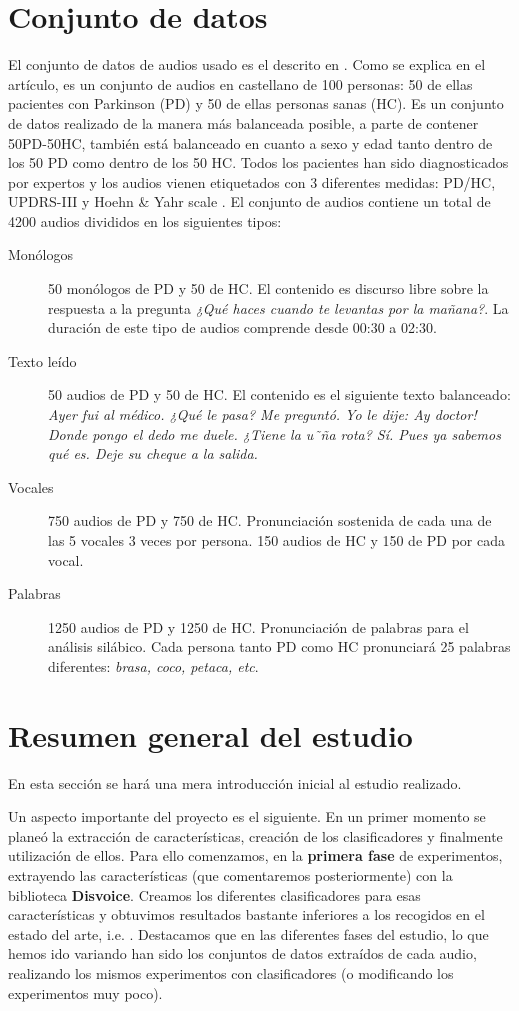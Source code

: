 \section{Conjunto de datos}
El conjunto de datos de audios usado es el descrito en \cite{OrzCorpus}. Como se explica en el artículo, es un conjunto de audios en castellano de 100 personas: 50 de ellas pacientes con Parkinson (PD) y 50 de ellas personas sanas (HC). Es un conjunto de datos realizado de la manera más balanceada posible, a parte de contener 50PD-50HC, también está balanceado en cuanto a sexo y edad tanto dentro de los 50 PD como dentro de los 50 HC. Todos los pacientes han sido diagnosticados por expertos y los audios vienen etiquetados con 3 diferentes medidas: PD/HC, UPDRS-III \cite{updrs} y  Hoehn \& Yahr scale \cite{hoehn1967}.
El conjunto de audios contiene un total de 4200 audios divididos en los siguientes tipos:
\begin{description}
	\item[Monólogos] 50 monólogos de PD y 50 de HC. El contenido es discurso libre sobre la respuesta a la pregunta \textit{¿Qué haces cuando te levantas por la mañana?}. La duración de este tipo de audios comprende desde 00:30 a 02:30.
	\item[Texto leído] 50 audios de PD y 50 de HC. El contenido es el siguiente texto balanceado: \textit{Ayer fui al médico. ¿Qué le pasa? Me preguntó. Yo le dije: Ay doctor! Donde pongo el dedo me duele. ¿Tiene la u˜ña rota? Sí. Pues ya sabemos qué es. Deje su cheque a la salida.}
	\item[Vocales] 750 audios de PD y 750 de HC. Pronunciación sostenida de cada una de las 5 vocales 3 veces por persona. 150 audios de HC y 150 de PD por cada vocal.
	\item[Palabras] 1250 audios de PD y 1250 de HC. Pronunciación de palabras para el análisis silábico. Cada persona tanto PD como HC pronunciará 25 palabras diferentes: \textit{brasa, coco, petaca, etc}.
\end{description}

\section{Resumen general del estudio}
En esta sección se hará una mera introducción inicial al estudio realizado.

Un aspecto importante del proyecto es el siguiente. En un primer momento se planeó la extracción de características, creación de los clasificadores y finalmente utilización de ellos. Para ello comenzamos, en la \textbf{primera fase} de experimentos, extrayendo las características (que comentaremos posteriormente) con la biblioteca \textbf{Disvoice}. Creamos los diferentes clasificadores para esas características y obtuvimos resultados bastante inferiores a los recogidos en el estado del arte, i.e. \cite{Orz2016}. Destacamos que en las diferentes fases del estudio, lo que hemos ido variando han sido los conjuntos de datos extraídos de cada audio, realizando los mismos experimentos con clasificadores (o modificando los experimentos muy poco).

